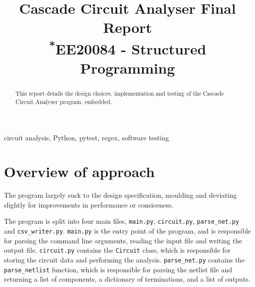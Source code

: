 \documentclass[conference]{IEEEtran}
\begin{document}
\title{Cascade Circuit Analyser Final Report\\
{\footnotesize \textsuperscript{*}EE20084 - Structured Programming}
}

\author{
}
\maketitle

\begin{abstract}
    This report details the design choices, implementation and testing of the Cascade Circuit Analyser program.
    embedded.
\end{abstract}

\begin{IEEEkeywords}
    circuit analysis, Python, pytest, regex, software testing
\end{IEEEkeywords}

\tableofcontents

\section{Overview of approach}
The program largely suck to the design specification, moulding and deviating slightly for improvements in performance
or consiceness.

The program is split into four main files, \texttt{main.py}, \texttt{circuit.py}, \texttt{parse\_net.py} and \texttt{csv\_writer.py}.
\texttt{main.py} is the entry point of the program, and is responsible for parsing the command line arguments, reading the input file and writing the output file.
\texttt{circuit.py} contains the \texttt{Circuit} class, which is responsible for storing the circuit data and performing the analysis.
\texttt{parse\_net.py} contains the \texttt{parse\_netlist} function, which is responsible for parsing the netlist file and returning a list of components, a dictionary of
terminations, and a list of outputs.
\end{document}
